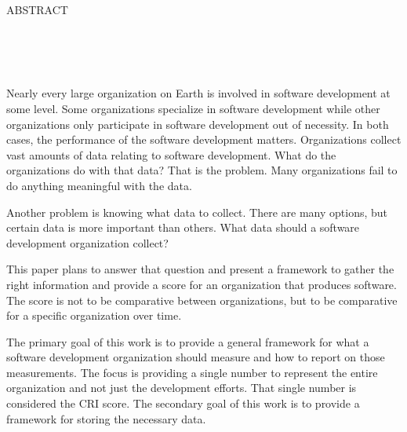 \documentclass[SDSUThesis.tex]{subfiles}
\begin{document}
\newpage
\doublespacing

\begin{center}
ABSTRACT\\

\yourtitle \\
\yourname \\
\number\year\\
\end{center}

\par
Nearly every large organization on Earth is involved in software development at some level.  Some organizations
specialize in software development while other organizations only participate in software development out of
necessity. In both cases, the performance of the software development matters.  Organizations collect
vast amounts of data relating to software development.  What do the organizations do with that data? 
That is the problem.  Many organizations fail to do anything meaningful with the data.  

Another problem is knowing what data to collect.  There are many options, but certain data is more important than
others.  What data should a software development organization collect?

This paper plans to answer that question and present a framework to gather the 
right information and provide a score for an organization that
produces software.  The score is not to be comparative between organizations, but to be comparative for a specific
organization over time.  

The primary goal of this work is to provide a general framework for what a software development organization
should measure and how to report on those measurements.  The focus is providing a single number
to represent the entire
organization and not just the development efforts.  That single number is considered the CRI score. The secondary goal of this work is to provide
a framework for storing the necessary data.
\end{document}
